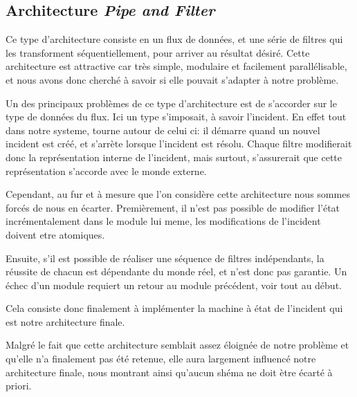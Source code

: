 \subsection{Architecture \emph{Pipe and Filter}}
	Ce type d'architecture consiste en un flux de données,
	et une série de filtres qui les transforment séquentiellement,
	pour arriver au résultat désiré. Cette architecture est
	attractive car très simple, modulaire et facilement parallélisable,
	et nous avons donc cherché à savoir si elle pouvait s'adapter à
	notre problème.

	Un des principaux problèmes de ce type d'architecture est de
	s'accorder sur le type de données du flux. Ici un type s'imposait,
	à savoir l'incident. En effet tout dans notre systeme, tourne
	autour de celui ci: il démarre quand un nouvel incident est créé,
	et s'arrète lorsque l'incident est résolu. Chaque filtre modifierait
	donc la représentation interne de l'incident, mais surtout, s'assurerait
	que cette représentation s'accorde avec le monde externe.

	Cependant, au fur et à mesure que l'on considère cette architecture
	nous sommes forcés de nous en écarter. Premièrement, il n'est pas 
	possible de modifier l'état incrémentalement dans le module lui meme,
	les modifications de l'incident doivent etre atomiques.

	Ensuite, s'il est possible de réaliser une séquence de filtres
	indépendants, la réussite de chacun est dépendante du monde réel,
	et n'est donc pas garantie. Un échec d'un module requiert
	un retour au module précédent, voir tout au début. 
	
	Cela consiste donc finalement à implémenter la machine à état de 
	l'incident qui est notre architecture finale.

	Malgré le fait que cette architecture semblait assez éloignée
	de notre problème et qu'elle n'a finalement pas été retenue,
	elle aura largement influencé notre architecture finale, nous
	montrant ainsi qu'aucun shéma ne doit ètre écarté à priori.




